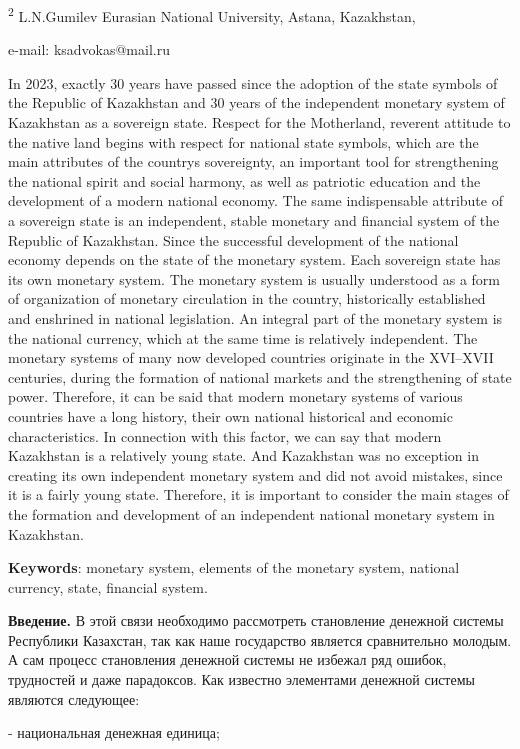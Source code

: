 \textsuperscript{2} L.N.Gumilev Eurasian National University, Astana,
Kazakhstan,

e-mail: ksadvokas@mail.ru

In 2023, exactly 30 years have passed since the adoption of the state
symbols of the Republic of Kazakhstan and 30 years of the independent
monetary system of Kazakhstan as a sovereign state. Respect for the
Motherland, reverent attitude to the native land begins with respect for
national state symbols, which are the main attributes of the
country\textquotesingle s sovereignty, an important tool for
strengthening the national spirit and social harmony, as well as
patriotic education and the development of a modern national economy.
The same indispensable attribute of a sovereign state is an independent,
stable monetary and financial system of the Republic of Kazakhstan.
Since the successful development of the national economy depends on the
state of the monetary system. Each sovereign state has its own monetary
system. The monetary system is usually understood as a form of
organization of monetary circulation in the country, historically
established and enshrined in national legislation. An integral part of
the monetary system is the national currency, which at the same time is
relatively independent. The monetary systems of many now developed
countries originate in the XVI--XVII centuries, during the formation of
national markets and the strengthening of state power. Therefore, it can
be said that modern monetary systems of various countries have a long
history, their own national historical and economic characteristics. In
connection with this factor, we can say that modern Kazakhstan is a
relatively young state. And Kazakhstan was no exception in creating its
own independent monetary system and did not avoid mistakes, since it is
a fairly young state. Therefore, it is important to consider the main
stages of the formation and development of an independent national
monetary system in Kazakhstan.

{\bfseries Keywords}: monetary system, elements of the monetary system,
national currency, state, financial system.

{\bfseries Введение.} В этой связи необходимо рассмотреть становление
денежной системы Республики Казахстан, так как наше государство является
сравнительно молодым. А сам процесс становления денежной системы не
избежал ряд ошибок, трудностей и даже парадоксов. Как известно
элементами денежной системы являются следующее:

- национальная денежная единица;

